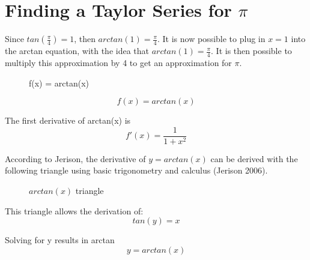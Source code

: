 \documentclass[12pt, titlepage]{article}
\begin{document}
\section{Finding a Taylor Series for \(\pi\)}
Since \(tan(\frac{\pi}{4}) = 1\), then \(arctan(1)= \frac{\pi}{4}\). It is now possible to plug in \(x = 1\) into the arctan equation, with the idea that \(arctan(1) = \frac{\pi}{4}\). It is then possible to multiply this approximation by 4 to get an approximation for \(\pi\).

\begin{figure}[H]
\centering
    \caption[]{f(x) = arctan(x)}
\end{figure}

\begin{equation*}
  f(x) = arctan(x)
\end{equation*}

The first derivative of arctan(x) is 
\begin{equation*}
f'(x) = \frac{1}{1 + x^{2}}
\end{equation*}

\newpage
According to Jerison, the derivative of \(y = arctan(x)\) can be derived with the following triangle using basic trigonometry and calculus (Jerison 2006).
\begin{figure}[H]
\centering
	\caption{\(arctan(x)\) triangle}
\end{figure}

This triangle allows the derivation of:
\begin{equation*}
 tan(y) = x
\end{equation*}

Solving for y results in arctan
\begin{equation*}
  y = arctan(x)
\end{equation*}
\end{document}
